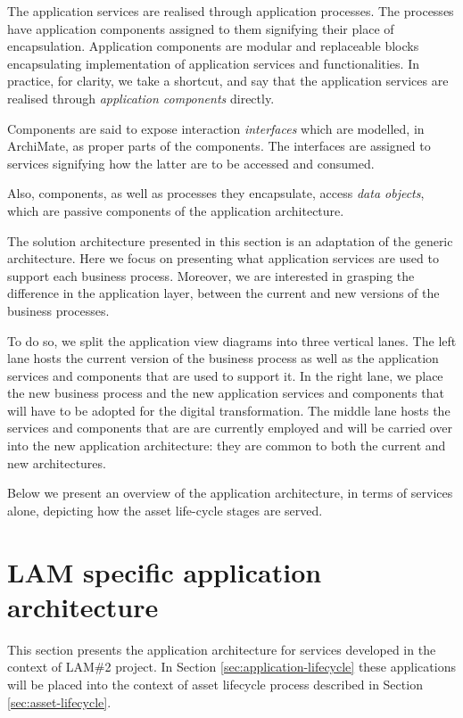 	The application services are realised through application processes. The processes have application components assigned to them signifying their place of encapsulation. Application components are modular and replaceable blocks encapsulating implementation of application services and functionalities. In practice, for clarity, we take a shortcut, and say that the application services are realised through \textit{application components} directly.
	
	Components are said to expose interaction \textit{interfaces} which are modelled, in ArchiMate, as proper parts of the components. The interfaces are assigned to services signifying how the latter are to be accessed and consumed. 
	
	Also, components, as well as processes they encapsulate, access \textit{data objects}, which are passive components of the application architecture.

	The solution architecture presented in this section is an adaptation of the generic architecture. Here we focus on presenting what application services are used to support each business process. Moreover, we are interested in grasping the difference in the application layer, between the current and new versions of the business processes. 
	
	To do so, we split the application view diagrams into three vertical lanes. The left lane hosts the current version of the business process as well as the application services and components that are used to support it. In the right lane, we place the new business process and the new application services and components that will have to be adopted for the digital transformation. The middle lane hosts the services and components that are are currently employed and will be carried over into the new application architecture: they are common to both the current and new architectures.

	Below we present an overview of the application architecture, in terms of services alone, depicting how the asset life-cycle stages are served.	
	
	\section{LAM specific application architecture}

	This section presents the application architecture for services developed in the context of LAM\#2 project. In Section \ref{sec:application-lifecycle} these applications will be placed into the context of asset lifecycle process described in Section \ref{sec:asset-lifecycle}. 
	
